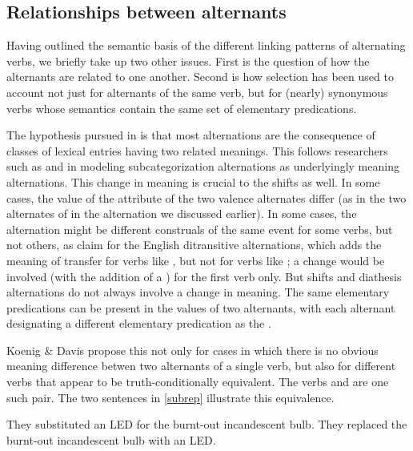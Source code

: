 \documentclass[output=paper
                ,modfonts
                ,nonflat
	        ,collection
	        ,collectionchapter
	        ,collectiontoclongg
 	        ,biblatex
                ,babelshorthands
                ,newtxmath
                ,draftmode
                ,colorlinks, citecolor=brown
]{./langsci/langscibook}
\begin{document}
\subsection{Relationships between alternants}

Having outlined the semantic basis of the different linking patterns of alternating verbs, we briefly take up two other issues.
First is the question of how the alternants are related to one another.
Second is how  selection has been used to account not just for alternants of the same verb, but for (nearly) synonymous verbs whose semantics contain the same set of elementary predications.

The hypothesis pursued in \citet{Davis1996,Davis2001}  is that 
most alternations are the consequence of classes of lexical entries having
two related meanings. This follows researchers such as \citet{Pinker1989} and \citet{Levin1993} in modeling subcategorization alternations as underlyingly meaning alternations. 
This change in meaning is crucial to the \citet{KoenigandDavis2006}  shifts as well. In some cases, the value of the \rels attribute of the two valence alternates differ (as in the two alternates of  in the alternation we discussed earlier).
In some cases, the alternation might be different construals of the same event for some verbs, but not others, as \citet{RappaportandLevin2008} claim for the English ditransitive  alternations, which adds the meaning of transfer for verbs like , but not for verbs like ; a  change would be involved (with the addition of a ) for the first verb only. But  shifts and diathesis alternations do not always involve a change in meaning. The same elementary predications can be present in the  values of two alternants, with each alternant designating a different elementary predication as the . 

Koenig \& Davis propose this not only for cases in which there is no obvious meaning difference betwen two alternants of a single verb, but also for different verbs that appear to be truth-conditionally equivalent.
The verbs  and  are one such pair.
The two sentences in \ref{subrep} illustrate this equivalence.

\begin{exe}
\ex\label{subrep}
\begin{xlist}
\ex\label{subrepa}They substituted an LED for the burnt-out incandescent bulb.
\ex\label{subrepb}They replaced the burnt-out incandescent bulb with an LED.
\end{xlist}
\end{exe}
\end{document}
